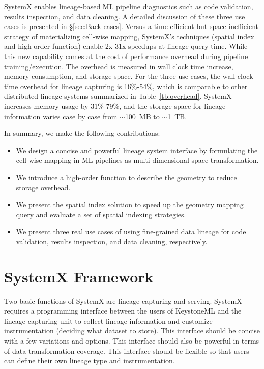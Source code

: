 \documentclass{sig-alternate}
\newenvironment{shortlist}{
        \vspace*{-0.5em}
  \begin{itemize}
  \setlength{\itemsep}{-0.1em}
}{
  \end{itemize}
        \vspace*{-0.5em}
}
\begin{document}
SystemX enables lineage-based ML pipeline diagnostics such as code validation, results inspection, and data cleaning.
A detailed discussion of these three use cases is presented in \S\ref{sec:Back-cases}.
Versus a time-efficient but space-inefficient strategy of materializing cell-wise mapping, 
SystemX's techniques (spatial index and high-order function) enable 2x-31x speedups at lineage query time.
While this new capability comes at the cost of performance overhead during pipeline training/execution.
The overhead is measured in wall clock time increase, memory consumption, and storage space.
For the three use cases, the wall clock time overhead for lineage capturing is 16\%-54\%, which is comparable to other distributed lineage systems
summarized in Table~\ref{tb:overhead}.
SystemX increases memory usage by 31\%-79\%,
and the storage space for lineage information varies case by case from $\sim$100~MB to $\sim$1~TB.


In summary, we make the following contributions:
\begin{shortlist}
\item{} We design a concise and powerful lineage system interface by formulating the cell-wise mapping in ML pipelines as multi-dimensional space transformation.
\item{} We introduce a high-order function to describe the geometry to reduce storage overhead.
\item{} We present the spatial index solution to speed up the geometry mapping query and evaluate a set of spatial indexing strategies.
\item{} We present three real use cases of using fine-grained data lineage for code validation, results inspection, and data cleaning, respectively.
\end{shortlist}

\section{S\MakeLowercase{ystem}X Framework}
\label{sec:functional}
Two basic functions of SystemX are lineage capturing and serving.
SystemX requires a programming interface between the users of KeystoneML and the lineage capturing unit to 
collect lineage information and customize instrumentation (deciding what dataset to store). 
This interface should be concise with a few variations and options.
This interface should also be powerful in terms of data transformation coverage.
This interface should be flexible so that users can define their own lineage type and instrumentation.
\end{document}
